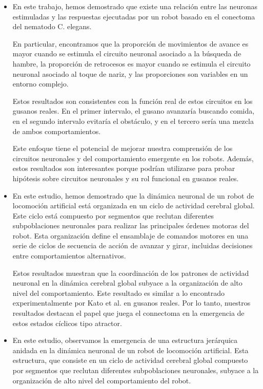 \begin{itemize}
	
	\item   En este trabajo, hemos demostrado que existe una relación entre las
	neuronas estimuladas y las respuestas ejecutadas por un robot basado en el
	conectoma del nematodo C. elegans.
	
	En particular, encontramos que la proporción de movimientos de avance es mayor
	cuando se estimula el circuito neuronal asociado a la búsqueda de hambre, la
	proporción de retrocesos es mayor cuando se estimula el circuito neuronal
	asociado al toque de nariz, y las proporciones son variables en un entorno
	complejo.
	
	Estos resultados son consistentes con la función real de estos circuitos en los
	gusanos reales. En el primer intervalo, el gusano avanzaría buscando comida, en
	el segundo intervalo evitaría el obstáculo, y en el tercero sería una mezcla de
	ambos comportamientos.
	
	Este enfoque tiene el potencial de mejorar nuestra comprensión de los circuitos
	neuronales y del comportamiento emergente en los robots. Además, estos
	resultados son interesantes porque podrían utilizarse para probar hipótesis
	sobre circuitos neuronales y su rol funcional en gusanos reales.
	
	
	\item  En este estudio, hemos demostrado que la dinámica neuronal de un robot de
	locomoción artificial está organizada en un ciclo de actividad cerebral global.
	Este ciclo está compuesto por segmentos que reclutan diferentes subpoblaciones
	neuronales para realizar las principales órdenes motoras del robot. Esta
	organización define el ensamblaje de comandos motores en una serie de ciclos de
	secuencia de acción de avanzar y girar, incluidas decisiones entre
	comportamientos alternativos.
	
	Estos resultados muestran que la coordinación de los patrones de actividad
	neuronal en la dinámica cerebral global subyace a la organización de alto nivel
	del comportamiento. Este resultado es similar a lo encontrado experimentalmente
	por Kato et al. en gusanos reales. Por lo tanto, nuestros resultados destacan el
	papel que juega el connectoma en la emergencia de estos estados cíclicos tipo
	atractor.
	
	\item En este estudio, observamos la emergencia de una estructura jerárquica
	anidada en la dinámica neuronal de un robot de locomoción artificial. Esta
	estructura, que consiste en un ciclo de actividad cerebral global compuesto por
	segmentos que reclutan diferentes subpoblaciones neuronales, subyace a la
	organización de alto nivel del comportamiento del robot.
	

\end{itemize}
